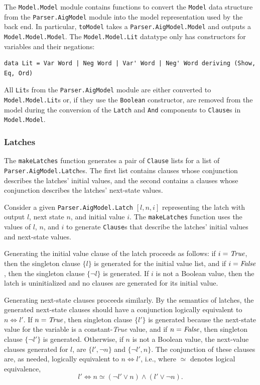 \documentclass[12pt,a4paper,twoside,openright]{report}
\begin{document}
{{The \verb,Model.Model, module contains functions to convert the \verb,Model, data
structure from the \verb,Parser.AigModel, module into the model representation
used by the back end. In particular, \verb,toModel, takes a \verb,Parser.AigModel.Model,
and outputs a \verb,Model.Model.Model,. The \verb,Model.Model.Lit,
datatype only has constructors for variables and their negations:
\begin{lstlisting}
data Lit = Var Word | Neg Word | Var' Word | Neg' Word deriving (Show, Eq, Ord)
\end{lstlisting}
All \verb,Lit,s from
the \verb,Parser.AigModel, module are either converted to \verb,Model.Model.Lit,s or, if
they use the \verb,Boolean, constructor, are removed from the model during the conversion of
the \verb,Latch, and \verb,And, components to \verb,Clause,s in \verb,Model.Model,.

\subsubsection{Latches}
The \verb,makeLatches, function generates a pair of \verb,Clause, lists
for a list of \verb,Parser.AigModel.Latch,es. The first list contains
clauses whose conjunction describes the latches' initial values,
and the second contains a clauses whose conjunction describes the
latches' next-state values.

Consider a given \verb,Parser.AigModel.Latch, $[l, n, i]$ representing the latch with
output $l$, next state $n$, %
and initial value $i$.
The \verb,makeLatches, function uses the
values of $l$, $n$, and $i$ to generate \verb,Clause,s that describe the latches' initial values and
next-state values.

Generating the initial value clause of the latch proceeds as follows: if $i = {\it True}$,
then the singleton clause $\{l\}$ is generated for the initial value list, and if $i = {\it False}$,
then the singleton clause $\{\neg l\}$ is generated.
If $i$ is not a Boolean value, then the latch is
uninitialized and no clauses are generated for its initial value.

Generating next-state clauses proceeds similarly.
By the semantics of latches, the generated next-state clauses should have
a conjunction logically equivalent to $n \Leftrightarrow l'$.
If $n = {\it True}$, then singleton clause
$\{l'\}$ is generated because the next-state value for the variable is a constant-{\it True} value,
and if $n = {\it False}$, then singleton clause $\{\neg l'\}$ is generated.
Otherwise, if $n$ is not a Boolean value,
the next-value clauses generated for $l$, are $\{l', \neg n\}$
and $\{\neg l', n\}$. The conjunction of these clauses are, as needed, logically equivalent
to $n \Leftrightarrow l'$, i.e., where $\simeq$ denotes logical equivalence,
$$l' \Leftrightarrow n \simeq (\neg l' \vee n) \wedge (l' \vee \neg n).$$

}}
\end{document}
